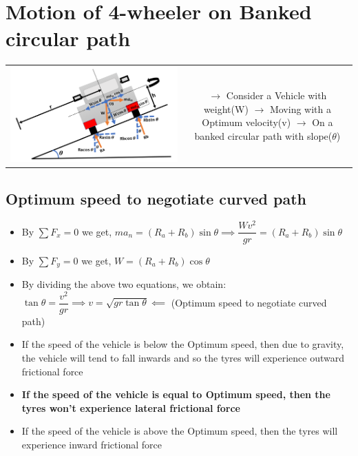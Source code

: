 \documentclass[8pt]{report}
\begin{document}
\section{Motion of 4-wheeler on Banked circular path}
	\begin{table}[H]
		\begin{tabular}{cc}
			\parbox{4cm}{\includegraphics[scale=0.5]{vehiclebanked.png}} & \hspace{6.5cm}
			\parbox{12cm}{$\rightarrow$ Consider a Vehicle with weight(W)\\\\$\rightarrow$ Moving with a Optimum velocity(v)\\\\$\rightarrow$ On a banked circular path with slope($\theta$)\\\\}
		\end{tabular}
	\end{table}
	\subsection{Optimum speed to negotiate curved path}
	\begin{itemize}
		\item By $\sum F_x=0$ we get, $ma_n=(R_a+R_b)\sin\theta \implies \dfrac{Wv^2}{gr}=(R_a+R_b)\sin\theta$
		\item By $\sum F_y=0$ we get, $W=(R_a+R_b)\cos\theta$
		\item By dividing the above two equations, we obtain: $\tan\theta=\dfrac{v^2}{gr} \implies \boxed{v=\sqrt{gr\tan\theta}} \impliedby$ (Optimum speed to negotiate curved path)
		\item If the speed of the vehicle is below the Optimum speed, then due to gravity, the vehicle will tend to fall inwards and so the tyres will experience outward frictional force
		\item \textbf{If the speed of the vehicle is equal to Optimum speed, then the tyres won't experience lateral frictional force}
		\item If the speed of the vehicle is above the Optimum speed, then the tyres will experience inward frictional force
	\end{itemize}\hrulefill
\end{document}
